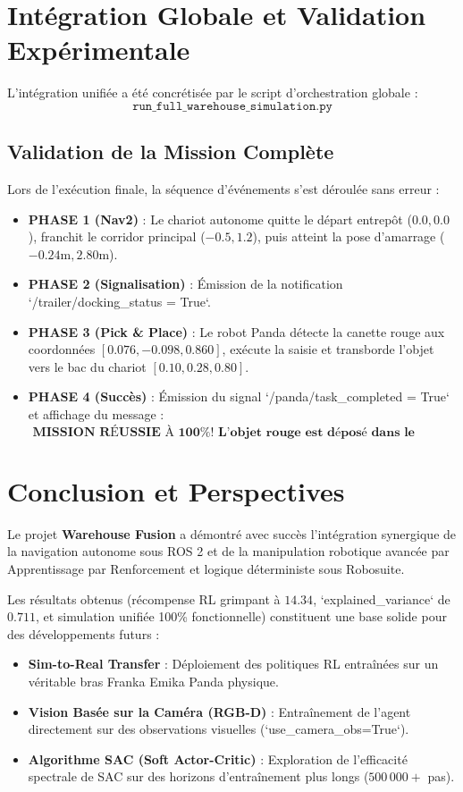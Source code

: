 \documentclass[11pt,a4paper]{article}
\begin{document}
\section{Intégration Globale et Validation Expérimentale}

L'intégration unifiée a été concrétisée par le script d'orchestration globale :
$$\texttt{run\_full\_warehouse\_simulation.py}$$

\subsection{Validation de la Mission Complète}
Lors de l'exécution finale, la séquence d'événements s'est déroulée sans erreur :
\begin{itemize}
    \item \textbf{PHASE 1 (Nav2)} : Le chariot autonome quitte le départ entrepôt ($0.0, 0.0$), franchit le corridor principal ($-0.5, 1.2$), puis atteint la pose d'amarrage ($-0.24\text{m}, 2.80\text{m}$).
    \item \textbf{PHASE 2 (Signalisation)} : Émission de la notification `/trailer/docking_status = True`.
    \item \textbf{PHASE 3 (Pick \& Place)} : Le robot Panda détecte la canette rouge aux coordonnées $[0.076, -0.098, 0.860]$, exécute la saisie et transborde l'objet vers le bac du chariot $[0.10, 0.28, 0.80]$.
    \item \textbf{PHASE 4 (Succès)} : Émission du signal `/panda/task_completed = True` et affichage du message :
    $$\textbf{ MISSION RÉUSSIE À 100\% ! L'objet rouge est déposé dans le chariot.}$$
\end{itemize}

\section{Conclusion et Perspectives}

Le projet \textbf{Warehouse Fusion} a démontré avec succès l'intégration synergique de la navigation autonome sous ROS 2 et de la manipulation robotique avancée par Apprentissage par Renforcement et logique déterministe sous Robosuite. 

Les résultats obtenus (récompense RL grimpant à $14.34$, `explained_variance` de $0.711$, et simulation unifiée 100\% fonctionnelle) constituent une base solide pour des développements futurs :
\begin{itemize}
    \item \textbf{Sim-to-Real Transfer} : Déploiement des politiques RL entraînées sur un véritable bras Franka Emika Panda physique.
    \item \textbf{Vision Basée sur la Caméra (RGB-D)} : Entraînement de l'agent directement sur des observations visuelles (`use_camera_obs=True`).
    \item \textbf{Algorithme SAC (Soft Actor-Critic)} : Exploration de l'efficacité spectrale de SAC sur des horizons d'entraînement plus longs ($500\,000+$ pas).
\end{itemize}
\end{document}

